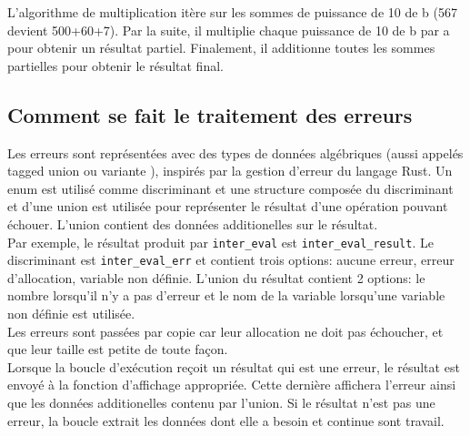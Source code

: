 \documentclass[a4paper,12pt,french]{article}
\begin{document}
		L'algorithme de multiplication itère sur les sommes de puissance de 10 de b (567 devient 500+60+7). Par la suite, il multiplie chaque puissance de 10 de b par a pour obtenir un résultat partiel. Finalement, il additionne toutes les sommes partielles pour obtenir le résultat final.
	\subsection{Comment se fait le traitement des erreurs}
		Les erreurs sont représentées avec des types de données algébriques (aussi appelés  \og tagged union \fg{}
		ou \og variante \fg{}), inspirés par la gestion d'erreur du langage Rust. Un enum est utilisé comme
		discriminant et une structure composée du discriminant et d'une union est utilisée pour représenter
		le résultat d'une opération pouvant échouer. L'union contient des données additionelles sur le
		résultat.\\

		Par exemple, le résultat produit par \lstinline$inter_eval$ est \lstinline$inter_eval_result$. Le discriminant
		est \lstinline$inter_eval_err$ et contient trois options: aucune erreur, erreur d'allocation, variable
		non définie. L'union du résultat contient 2 options: le nombre lorsqu'il n'y a pas d'erreur et
		le nom de la variable lorsqu'une variable non définie est utilisée.\\

		Les erreurs sont passées par copie car leur allocation ne doit pas échoucher, et que leur taille
		est petite de toute façon.\\

		Lorsque la boucle d'exécution reçoit un résultat qui est une erreur, le résultat est envoyé à la
		fonction d'affichage appropriée. Cette dernière affichera l'erreur ainsi que les données additionelles
		contenu par l'union. Si le résultat n'est pas une erreur, la boucle extrait les données dont elle
		a besoin et continue sont travail.
\end{document}
